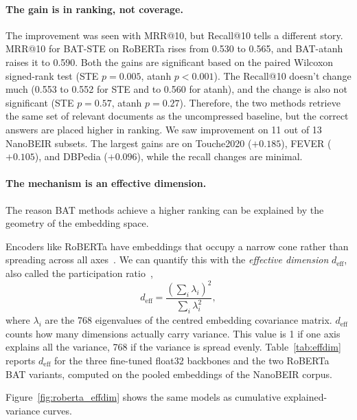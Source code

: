 \paragraph{The gain is in ranking, not coverage.}
The improvement was seen with MRR@10, but Recall@10 tells a different story.
MRR@10 for BAT-STE on RoBERTa rises from 0.530 to 0.565, and BAT-atanh raises it to 0.590. Both the gains are significant based on the paired Wilcoxon signed-rank test (STE $p=0.005$, atanh $p<0.001$). The Recall@10 doesn't change much (0.553 to 0.552 for STE and to 0.560 for atanh), and the change is also not significant (STE $p=0.57$, atanh $p=0.27$). Therefore, the two methods retrieve the same set of relevant documents as the uncompressed baseline, but the correct answers are placed higher in ranking. We saw improvement on 11 out of 13 NanoBEIR subsets.  The largest gains are
on Touche2020 ($+0.185$), FEVER ($+0.105$), and DBPedia ($+0.096$),
while the recall changes are minimal.

\paragraph{The mechanism is an effective dimension.}
The reason BAT methods achieve a higher ranking can be explained by the geometry of the embedding space. 

Encoders like RoBERTa have embeddings that occupy a narrow cone rather than spreading across all axes~\cite{ethayarajh2019contextual}. We can quantify this with the
\emph{effective dimension} $d_{\text{eff}}$, also called the
participation ratio~\cite{litwinkumar2017optimal, gao2017theory},
\begin{equation}
  d_{\text{eff}} = \frac{\left(\sum_i \lambda_i\right)^2}{\sum_i \lambda_i^2},
\end{equation}
where $\lambda_i$ are the 768 eigenvalues of the centred embedding
covariance matrix. $d_{\text{eff}}$ counts how many dimensions actually
carry variance. This value is 1 if one axis explains all the variance, 768 if the variance is spread evenly.  Table~\ref{tab:effdim} reports
$d_{\text{eff}}$ for the three fine-tuned float32 backbones and the two
RoBERTa BAT variants, computed on the pooled embeddings of the NanoBEIR corpus.

Figure~\ref{fig:roberta_effdim} shows the same models as cumulative
explained-variance curves.

